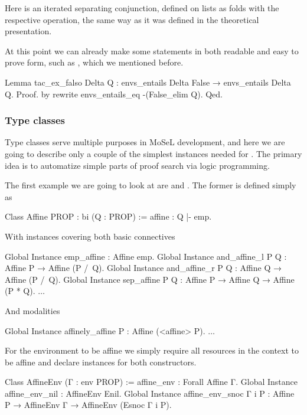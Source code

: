Here \coqe{[*]} is an iterated separating conjunction, defined on lists as folds with the respective operation, the same way as it was defined in the theoretical presentation.

At this point we can already make some statements in both readable and easy to prove form, such as , which we mentioned before.

\begin{coq}
Lemma tac_ex_falso Delta Q : envs_entails Delta False → envs_entails Delta Q.
Proof. by rewrite envs_entails_eq -(False_elim Q). Qed.
\end{coq}

\subsubsection{Type classes}
\label{subsubsec:typeclasses}

Type classes serve multiple purposes in MoSeL development, and here we are going to describe only a couple of the simplest instances needed for .
The primary idea is to automatize simple parts of proof search via logic programming.

The first example we are going to look at are  and .
The former is defined simply as
\begin{coq}
Class Affine {PROP : bi} (Q : PROP) := affine : Q |- emp.
\end{coq}

With instances covering both basic connectives
\begin{coq}
Global Instance emp_affine : Affine emp.
Global Instance and_affine_l P Q : Affine P → Affine (P /\ Q).
Global Instance and_affine_r P Q : Affine Q → Affine (P /\ Q).
Global Instance sep_affine P Q : Affine P → Affine Q → Affine (P * Q).
$\ldots$
\end{coq}

And modalities
\begin{coq}
Global Instance affinely_affine P : Affine (<affine> P).
$\ldots$
\end{coq}

For the environment to be affine we simply require all resources in the context to be affine and declare instances for both constructors.
\begin{coq}
Class AffineEnv (Γ : env PROP) := affine_env : Forall Affine Γ.
Global Instance affine_env_nil : AffineEnv Enil.
Global Instance affine_env_snoc Γ i P :
  Affine P → AffineEnv Γ → AffineEnv (Esnoc Γ i P).
\end{coq}

